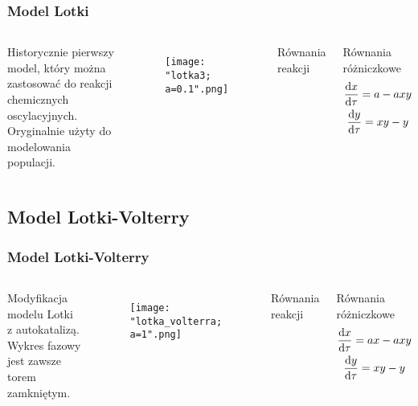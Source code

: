 \documentclass{beamer}
\begin{document}
\begin{frame}
\frametitle{Model Lotki}
\begin{columns}
Historycznie pierwszy model, który można zastosować do reakcji chemicznych oscylacyjnych. Oryginalnie użyty do modelowania populacji. \\
\begin{figure}
\texttt{[image: "lotka3; a=0.1".png]}
\end{figure}
\begin{block}{Równania reakcji}
\begin{center}
	 \\
	 \\
\end{center}
\end{block}
\begin{block}{Równania różniczkowe}
\begin{gather*}
	\dv{x}{\tau} = a-axy \\
	\dv{y}{\tau} = xy-y
\end{gather*}
\end{block}
\end{columns}
\end{frame}

\subsection{Model Lotki-Volterry}

\begin{frame}
\frametitle{Model Lotki-Volterry}
\begin{columns}
Modyfikacja modelu Lotki z autokatalizą. Wykres fazowy jest zawsze torem zamkniętym.  
\begin{figure}
\texttt{[image: "lotka\_volterra; a=1".png]}
\end{figure}
\begin{block}{Równania reakcji}
\begin{center}
	 \\
	 \\
\end{center}
\end{block}
\begin{block}{Równania różniczkowe}
\begin{gather*}
	\dv{x}{\tau} = ax-axy \\
	\dv{y}{\tau} = xy-y
\end{gather*}
\end{block}
\end{columns}
\end{frame}
\end{document}
